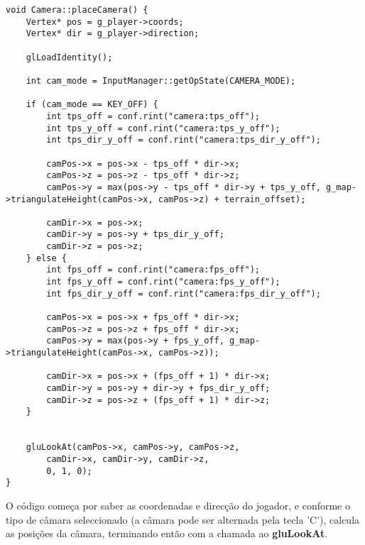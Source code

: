 \begin{lstlisting}
void Camera::placeCamera() {
	Vertex* pos = g_player->coords;
	Vertex* dir = g_player->direction;

	glLoadIdentity();

	int cam_mode = InputManager::getOpState(CAMERA_MODE);

	if (cam_mode == KEY_OFF) {
		int tps_off = conf.rint("camera:tps_off");
		int tps_y_off = conf.rint("camera:tps_y_off");
		int tps_dir_y_off = conf.rint("camera:tps_dir_y_off");

		camPos->x = pos->x - tps_off * dir->x;
		camPos->z = pos->z - tps_off * dir->z;
		camPos->y = max(pos->y - tps_off * dir->y + tps_y_off, g_map->triangulateHeight(camPos->x, camPos->z) + terrain_offset);

		camDir->x = pos->x;
		camDir->y = pos->y + tps_dir_y_off;
		camDir->z = pos->z;
	} else {
		int fps_off = conf.rint("camera:fps_off");
		int fps_y_off = conf.rint("camera:fps_y_off");
		int fps_dir_y_off = conf.rint("camera:fps_dir_y_off");

		camPos->x = pos->x + fps_off * dir->x;
		camPos->z = pos->z + fps_off * dir->x;
		camPos->y = max(pos->y + fps_y_off, g_map->triangulateHeight(camPos->x, camPos->z));

		camDir->x = pos->x + (fps_off + 1) * dir->x;
		camDir->y = pos->y + dir->y + fps_dir_y_off;
		camDir->z = pos->z + (fps_off + 1) * dir->z;
	}


	gluLookAt(camPos->x, camPos->y, camPos->z,
		camDir->x, camDir->y, camDir->z,
		0, 1, 0);
}

\end{lstlisting} 

O código começa por saber as coordenadas e direcção do jogador, e conforme o tipo de câmara seleccionado (a câmara pode ser alternada pela tecla 'C'), calcula as posições da câmara, terminando então com a chamada ao \textbf{gluLookAt}.
